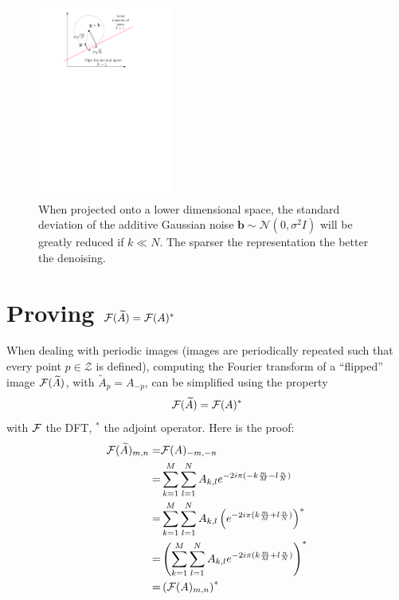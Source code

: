 \begin{figure}[!ht]\centering
\includegraphics[width=0.4\textwidth]{figures/sparse-reduce-noise.pdf}
\caption{When projected onto a lower dimensional space, the standard deviation of the additive Gaussian noise $\bm{b} \sim \mathcal{N}(0,\sigma^2I)$ will be greatly reduced if $k \ll N$. The sparser the representation the better the denoising.\label{sparse_reduce_noise}}
\end{figure}

\FloatBarrier

\section{Proving ${\mathcal F}(\widetilde{A}) = {\mathcal F}(A)^*$}\label{sec_proof_fourier_flip_adjoint}
When dealing with periodic images (images are periodically repeated such that every point $p \in \mathcal{Z}$ is defined), computing the Fourier transform of a “flipped” image ${\mathcal F}(\widetilde{A})$, with $\widetilde{A}_p = A_{-p}$, can be simplified using the property
\begin{equation*}
{\mathcal F}(\widetilde{A}) = {\mathcal F}(A)^*
\end{equation*}
with ${\mathcal F}$ the \ac{DFT}, $^*$ the adjoint operator. Here is the proof:
\begin{align*}
{\mathcal F}({\widetilde{A}})_{m,n} =& {\mathcal F}(A)_{-m,-n} \\
=& \sum_{k=1}^M \sum_{l=1}^N A_{k,l} e^{-2i\pi (-k\frac{m}{M}-l \frac{n}{N})}\\
=& \sum_{k=1}^M \sum_{l=1}^N A_{k,l} \left( e^{-2i\pi (k\frac{m}{M}+l \frac{n}{N})} \right)^*\\
=& \left( \sum_{k=1}^M \sum_{l=1}^N A_{k,l} e^{-2i\pi (k\frac{m}{M}+l \frac{n}{N})} \right)^*\\
=& \left( {\mathcal F}(A)_{m,n} \right)^*
\end{align*}



\printglossary
{\let\clearpage\relax \printacronyms}
\printbibliography[title=References]


